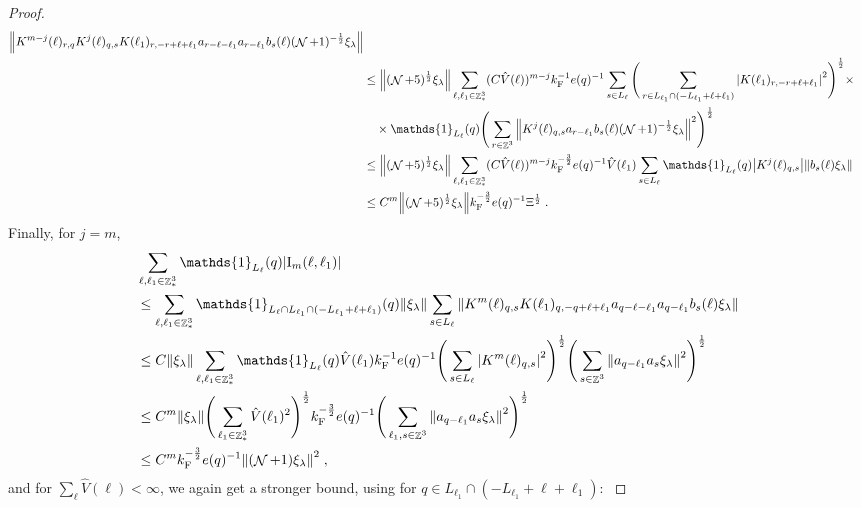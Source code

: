 \documentclass[12pt,a4paper]{article}
\numberwithin{equation}{section}
\newcommand{\1}{\mathbb{I}}
\newcommand{\F}{\mathrm{F}}
\newcommand{\I}{\mathrm{I}}
\DeclareMathOperator{\Z}{\mathbb{Z}}
\DeclareMathOperator{\NN}{\mathcal{N}}
\newcommand{\half}{\frac{1}{2}}
\theoremstyle{plain}
\theoremstyle{definition}
\theoremstyle{remark}
\theoremstyle{plain}
\theoremstyle{definition}
\theoremstyle{remark}
\begin{document}
\begin{proof}
\begin{align}
		\norm{K^{m-j}(\ell)_{r,q} K^j(\ell)_{q,s} K(\ell_1)_{r,-r+\ell+\ell_1} a_{r-\ell-\ell_1} a_{r-\ell_1} b_{s}(\ell) (\NN+1)^{-\half} \xi_\lambda }\nonumber\\
	&\leq \norm{ (\NN+5)^{\half} \xi_\lambda} 
		\sum_{\ell,\ell_1 \in \Z^3_*} (C \hat{V}(\ell))^{m-j} k_{\F}^{-1} e(q)^{-1}
		\sum\limits_{s\in L_{\ell}} 
		\Bigg(\sum\limits_{r\in L_{\ell_1} \cap (-L_{\ell_1} + \ell + \ell_1)}\abs{ K(\ell_1)_{r,-r+\ell+\ell_1} }^2\Bigg)^\half \times\nonumber\\ 
	&\quad \times \mathds{1}_{L_\ell}(q) \Bigg( \sum\limits_{r \in \Z^3}\norm{K^{j}(\ell)_{q,s} a_{r-\ell_1} b_{s}(\ell) (\NN+1)^{-\half} \xi_\lambda }^2 \Bigg)^\half \nonumber\\
	&\leq \norm{ (\NN+5)^{\half} \xi_\lambda}
		\sum_{\ell,\ell_1 \in \Z^3_*} (C \hat{V}(\ell))^{m-j} k_{\F}^{-\frac 32} e(q)^{-1}
		\hat{V}(\ell_1)
		\sum\limits_{s\in L_{\ell}} \mathds{1}_{L_\ell}(q) \abs{K^{j}(\ell)_{q,s}}
		\norm{b_{s}(\ell) \xi_\lambda }		
	\nonumber\\
	&\leq C^m \norm{(\NN+5)^\half \xi_\lambda }
		k_{\F}^{-\frac 32} e(q)^{-1} \Xi^\half \;. \label{eq:estEQ1122}
\end{align}
Finally, for $ j = m $,
\textcolor{green!30!black}{
\begin{align}
	&\sum_{\ell,\ell_1 \in \Z^3_*} \mathds{1}_{L_\ell}(q) |\I_m(\ell, \ell_1)| \nonumber\\
	&\leq \sum_{\ell,\ell_1 \in \Z^3_*} \mathds{1}_{L_\ell \cap L_{\ell_1} \cap (-L_{\ell_1} + \ell + \ell_1)}(q) \norm{\xi_\lambda}
		\sum\limits_{s \in L_{\ell}}
		\norm{ K^m(\ell)_{q,s} K(\ell_1)_{q,-q+\ell+\ell_1} a_{q-\ell-\ell_1} a_{q-\ell_1} b_{s}(\ell) \xi_\lambda } \nonumber\\
	&\leq C \norm{\xi_\lambda}
		\sum_{\ell,\ell_1 \in \Z^3_*} \mathds{1}_{L_\ell}(q) \hat{V}(\ell_1) k_{\F}^{-1} e(q)^{-1}
		\Bigg( \sum\limits_{s \in L_\ell} \abs{K^m(\ell)_{q,s}}^2\Bigg)^\half \Bigg(\sum\limits_{s \in \Z^3} \norm{ a_{q-\ell_1} a_s \xi_\lambda }^2\Bigg)^\half \nonumber\\
	&\leq C^m \norm{\xi_\lambda }
		\Bigg( \sum_{\ell_1 \in \Z^3_*} \hat{V}(\ell_1)^2 \Bigg)^{\half}
		k_{\F}^{-\frac 32} e(q)^{-1}
		\Bigg(\sum\limits_{\ell_1,s \in \Z^3} \norm{ a_{q-\ell_1} a_s \xi_\lambda }^2\Bigg)^\half \nonumber\\
	&\leq C^m k_{\F}^{-\frac 32} e(q)^{-1} \norm{(\NN+1) \xi_\lambda }^2 \;, \label{eq:estEQ1123_Coulomb}
\end{align}
and for $ \sum_{\ell} \hat{V}(\ell) < \infty $, we again get a stronger bound, using for $ q \in L_{\ell_1} \cap (-L_{\ell_1} + \ell + \ell_1) $:
}
\end{proof}
\end{document}

